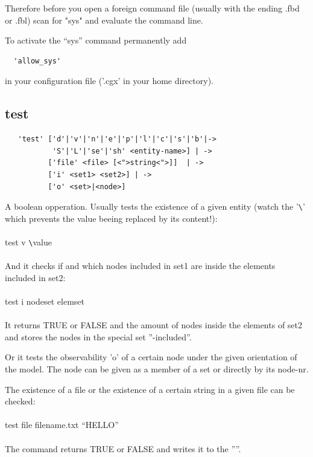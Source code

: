 \documentclass{article}
\begin{document}
Therefore before you open a foreign command file (usually with the ending .fbd or .fbl) scan for "sys" and evaluate the command line.

To activate the ``sys'' command permanently add
\begin{verbatim}
  'allow_sys'
\end{verbatim}
in your configuration file ('.cgx' in your home directory).
 
\subsection{\label{test}test}
\begin{verbatim}
   'test' ['d'|'v'|'n'|'e'|'p'|'l'|'c'|'s'|'b'|->
           'S'|'L'|'se'|'sh' <entity-name>] | ->
          ['file' <file> [<">string<">]]  | ->
          ['i' <set1> <set2>] | ->
          ['o' <set>|<node>]
\end{verbatim}
A boolean opperation. Usually tests the existence of a given entity (watch the '\verb_\_' which prevents the value beeing replaced by its content!):\\\\test v \verb_\_value\\\\And it checks if and which nodes included in set1 are inside the elements included in set2:\\\\test i nodeset elemset\\\\It returns TRUE or FALSE and the amount of nodes inside the elements of set2 and stores the nodes in the special set ''-included''.

Or it tests the observability 'o' of a certain node under the given orientation of the model. The node can be given as a member of a set or directly by its node-nr.

The existence of a file or the existence of a certain string in a given file can be checked:\\\\test file filename.txt ``HELLO''\\\\The command returns TRUE or FALSE and writes it to the ''''.
\end{document}
